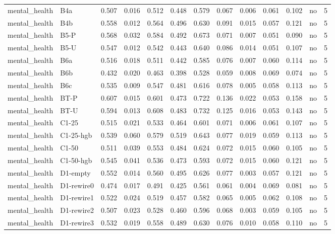 \begin{table}[t]
\begin{tabular}{lllllllllllll}
mental\_health & B4a & 0.507 & 0.016 & 0.512 & 0.448 & 0.579 & 0.067 & 0.006 & 0.061 & 0.102 & no & 5 \\
mental\_health & B4b & 0.558 & 0.012 & 0.564 & 0.496 & 0.630 & 0.091 & 0.015 & 0.057 & 0.121 & no & 5 \\
mental\_health & B5-P & 0.568 & 0.032 & 0.584 & 0.492 & 0.673 & 0.071 & 0.007 & 0.051 & 0.090 & no & 5 \\
mental\_health & B5-U & 0.547 & 0.012 & 0.542 & 0.443 & 0.640 & 0.086 & 0.014 & 0.051 & 0.107 & no & 5 \\
mental\_health & B6a & 0.516 & 0.018 & 0.511 & 0.442 & 0.585 & 0.076 & 0.007 & 0.060 & 0.114 & no & 5 \\
mental\_health & B6b & 0.432 & 0.020 & 0.463 & 0.398 & 0.528 & 0.059 & 0.008 & 0.069 & 0.074 & no & 5 \\
mental\_health & B6c & 0.535 & 0.009 & 0.547 & 0.481 & 0.616 & 0.078 & 0.005 & 0.058 & 0.113 & no & 5 \\
mental\_health & BT-P & 0.607 & 0.015 & 0.601 & 0.473 & 0.722 & 0.136 & 0.022 & 0.053 & 0.158 & no & 5 \\
mental\_health & BT-U & 0.594 & 0.013 & 0.608 & 0.483 & 0.732 & 0.125 & 0.016 & 0.053 & 0.143 & no & 5 \\
mental\_health & C1-25 & 0.515 & 0.021 & 0.533 & 0.464 & 0.601 & 0.071 & 0.006 & 0.061 & 0.107 & no & 5 \\
mental\_health & C1-25-hgb & 0.539 & 0.060 & 0.579 & 0.519 & 0.643 & 0.077 & 0.019 & 0.059 & 0.113 & no & 5 \\
mental\_health & C1-50 & 0.511 & 0.039 & 0.553 & 0.484 & 0.624 & 0.072 & 0.015 & 0.060 & 0.105 & no & 5 \\
mental\_health & C1-50-hgb & 0.545 & 0.041 & 0.536 & 0.473 & 0.593 & 0.072 & 0.015 & 0.060 & 0.121 & no & 5 \\
mental\_health & D1-empty & 0.552 & 0.014 & 0.560 & 0.495 & 0.626 & 0.077 & 0.003 & 0.057 & 0.121 & no & 5 \\
mental\_health & D1-rewire0 & 0.474 & 0.017 & 0.491 & 0.425 & 0.561 & 0.061 & 0.004 & 0.069 & 0.081 & no & 5 \\
mental\_health & D1-rewire1 & 0.522 & 0.024 & 0.519 & 0.457 & 0.582 & 0.065 & 0.005 & 0.062 & 0.108 & no & 5 \\
mental\_health & D1-rewire2 & 0.507 & 0.023 & 0.528 & 0.460 & 0.596 & 0.068 & 0.003 & 0.059 & 0.105 & no & 5 \\
mental\_health & D1-rewire3 & 0.532 & 0.019 & 0.558 & 0.489 & 0.630 & 0.076 & 0.010 & 0.058 & 0.110 & no & 5 \\

\end{tabular}
\end{table}
